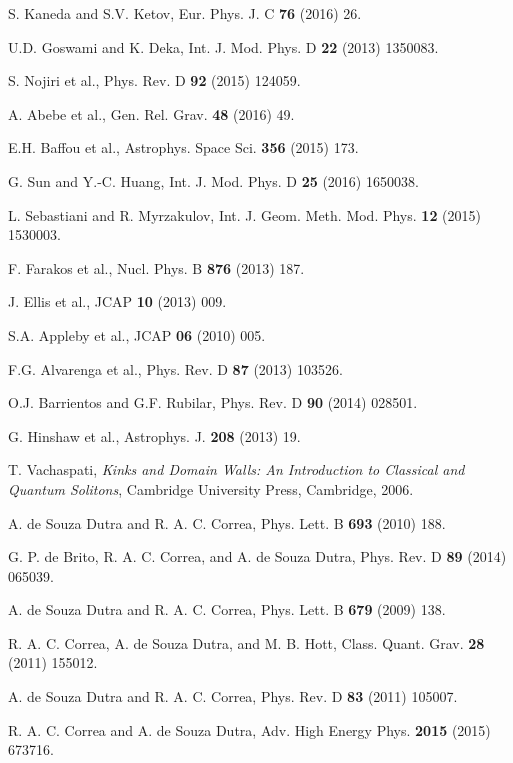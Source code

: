 \begin{thebibliography}{99}
 S. Kaneda and S.V. Ketov, Eur. Phys. J. C \textbf{76}
(2016) 26.

 U.D. Goswami and K. Deka, Int. J. Mod. Phys. D 
\textbf{22} (2013) 1350083.

 S. Nojiri et al., Phys. Rev. D \textbf{92} (2015)
124059.

 A. Abebe et al., Gen. Rel. Grav. \textbf{48} (2016) 49.

 E.H. Baffou et al., Astrophys. Space Sci. \textbf{356}
(2015) 173.

 G. Sun and Y.-C. Huang, Int. J. Mod. Phys. D \textbf{25}
(2016) 1650038.

 L. Sebastiani and R. Myrzakulov, Int. J. Geom.
Meth. Mod. Phys. \textbf{12} (2015) 1530003.

 F. Farakos et al., Nucl. Phys. B \textbf{876} (2013)
187.

 J. Ellis et al., JCAP \textbf{10} (2013) 009.

 S.A. Appleby et al., JCAP \textbf{06} (2010) 005. 

 F.G. Alvarenga et al., Phys. Rev. D {\bf 87} (2013) 103526.

 O.J. Barrientos and G.F. Rubilar, Phys. Rev. D {\bf 90} (2014) 028501.

 G. Hinshaw et al., Astrophys. J. \textbf{208} (2013)
19.

 T. Vachaspati, \textit{Kinks and Domain Walls: An Introduction
to Classical and Quantum Solitons}, Cambridge University Press, Cambridge,
2006.

 A. de Souza Dutra and R. A. C. Correa, Phys. Lett. B \textbf{%
693} (2010) 188.

 G. P. de Brito, R. A. C. Correa, and A. de Souza Dutra, Phys.
Rev. D \textbf{89} (2014) 065039.

 A. de Souza Dutra and R. A. C. Correa, Phys. Lett. B \textbf{%
679} (2009) 138.

 R. A. C. Correa, A. de Souza Dutra, and M. B. Hott, Class.
Quant. Grav. \textbf{28} (2011) 155012.

 A. de Souza Dutra and R. A. C. Correa, Phys. Rev. D \textbf{83}
(2011) 105007.

 R. A. C. Correa and A. de Souza Dutra, Adv. High Energy Phys. 
\textbf{2015} (2015) 673716.


\end{thebibliography}
